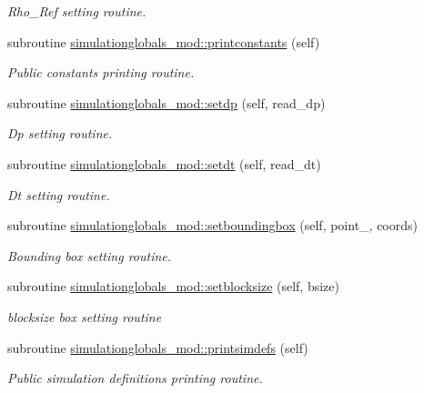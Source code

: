 \begin{DoxyCompactItemize}
\begin{DoxyCompactList}\small\item\em Rho\+\_\+\+Ref setting routine. \end{DoxyCompactList}\item 
subroutine \mbox{\hyperlink{namespacesimulationglobals__mod_a139cb36f8366e6aec875c7977235fd68}{simulationglobals\+\_\+mod\+::printconstants}} (self)
\begin{DoxyCompactList}\small\item\em Public constants printing routine. \end{DoxyCompactList}\item 
subroutine \mbox{\hyperlink{namespacesimulationglobals__mod_afda1e73e6e0cd075875c70aded99d425}{simulationglobals\+\_\+mod\+::setdp}} (self, read\+\_\+dp)
\begin{DoxyCompactList}\small\item\em Dp setting routine. \end{DoxyCompactList}\item 
subroutine \mbox{\hyperlink{namespacesimulationglobals__mod_a0eced3f4367d08f3d0cb6ef2044bdc56}{simulationglobals\+\_\+mod\+::setdt}} (self, read\+\_\+dt)
\begin{DoxyCompactList}\small\item\em Dt setting routine. \end{DoxyCompactList}\item 
subroutine \mbox{\hyperlink{namespacesimulationglobals__mod_abf5afcc12763caab3a5fc394255ced44}{simulationglobals\+\_\+mod\+::setboundingbox}} (self, point\+\_\+, coords)
\begin{DoxyCompactList}\small\item\em Bounding box setting routine. \end{DoxyCompactList}\item 
subroutine \mbox{\hyperlink{namespacesimulationglobals__mod_af0bc0b00ee3aa2ba9e47dc50daa72799}{simulationglobals\+\_\+mod\+::setblocksize}} (self, bsize)
\begin{DoxyCompactList}\small\item\em blocksize box setting routine \end{DoxyCompactList}\item 
subroutine \mbox{\hyperlink{namespacesimulationglobals__mod_a54196bff569fc838730ba39a722319ff}{simulationglobals\+\_\+mod\+::printsimdefs}} (self)
\begin{DoxyCompactList}\small\item\em Public simulation definitions printing routine. \end{DoxyCompactList}\item 

\end{DoxyCompactItemize}
